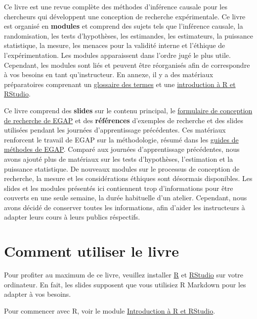 \documentclass[
  12pt,
]{book}
\begin{document}
Ce livre est une revue complète des méthodes d'inférence causale pour les chercheurs qui développent une conception de recherche expérimentale. Ce livre est organisé en \textbf{modules} et comprend des sujets tels que l'inférence causale, la randomisation, les tests d'hypothèses, les estimandes, les estimateurs, la puissance statistique, la mesure, les menaces pour la validité interne et l'éthique de l'expérimentation. Les modules apparaissent dans l'ordre jugé le plus utile. Cependant, les modules sont liés et peuvent être réorganisés afin de correspondre à vos besoins en tant qu'instructeur. En annexe, il y a des matériaux préparatoires comprenant un \href{glossary-of-terms.html}{glossaire des termes} et une \href{introduction-to-r-and-rstudio.html}{introduction à R et RStudio}.

Ce livre comprend des \textbf{slides} sur le contenu principal, le \href{researchdesignform.html}{formulaire de conception de recherche de EGAP} et des \textbf{références} d'exemples de recherche et des slides utilisées pendant les journées d'apprentissage précédentes. Ces matériaux renforcent le travail de EGAP sur la méthodologie, résumé dans les \href{https://egap.org/methods-guides/}{guides de méthodes de EGAP}. Comparé aux journées d'apprentissage précédentes, nous avons ajouté plus de matériaux sur les tests d'hypothèses, l'estimation et la puissance statistique. De nouveaux modules sur le processus de conception de recherche, la mesure et les considérations éthiques sont désormais disponibles. Les slides et les modules présentés ici contiennent trop d'informations pour être couverts en une seule semaine, la durée habituelle d'un atelier. Cependant, nous avons décidé de conserver toutes les informations, afin d'aider les instructeurs à adapter leurs cours à leurs publics réspectifs.

\hypertarget{comment-utiliser-le-livre}{%
\section{Comment utiliser le livre}\label{comment-utiliser-le-livre}}

Pour profiter au maximum de ce livre, veuillez installer \href{https://cran.r-project.org/}{R} et \href{https://www.rstudio.com/products/rstudio/download/}{RStudio} sur votre ordinateur. En fait, les slides supposent que vous utilisiez R Markdown pour les adapter à vos besoins.

Pour commencer avec R, voir le module \href{introduction-to-r-and-rstudio.html}{Introduction à R et RStudio}.
\end{document}
